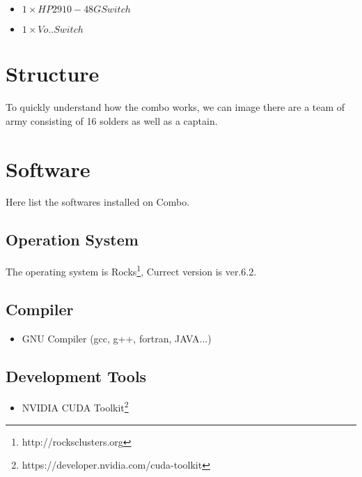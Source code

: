 \begin{itemize}
\item $1 \times HP 2910-48G Switch $
\item $1 \times Vo.. Switch $
\end{itemize}


\section{Structure}

To quickly understand how the combo works, we can image there are a team of army consisting of 16 solders as well as a captain. 


\section{Software}

Here list the softwares installed on Combo.

\subsection{Operation System}

The operating system is Rocks\footnote{http://rocksclusters.org}, Currect version is ver.6.2.

\subsection{Compiler}

\begin{itemize}
\item GNU Compiler (gcc, g++, fortran, JAVA...)
\end{itemize}

\subsection{Development Tools}

\begin{itemize}
\item NVIDIA CUDA Toolkit\footnote{https://developer.nvidia.com/cuda-toolkit}
\end{itemize}